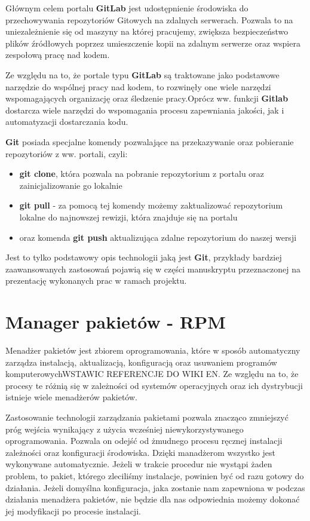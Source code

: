 Głównym celem portalu \textbf{GitLab} jest udostępnienie środowiska do przechowywania repozytoriów Gitowych na zdalnych serwerach. Pozwala to na uniezależnienie się od maszyny na której pracujemy, zwiększa bezpieczeństwo plików źródłowych poprzez umieszczenie kopii na zdalnym serwerze oraz wspiera zespołową pracę nad kodem.\par

Ze względu na to, że portale typu \textbf{GitLab} są traktowane jako podstawowe narzędzie do wspólnej pracy nad kodem, to rozwinęły one wiele narzędzi wspomagających organizację oraz śledzenie pracy.Oprócz ww. funkcji \textbf{Gitlab} dostarcza wiele narzędzi do wspomagania procesu zapewniania jakości, jak i automatyzacji dostarczania kodu.\par

\textbf{Git} posiada specjalne komendy pozwalające na przekazywanie oraz pobieranie repozytoriów z ww. portali, czyli:
\begin{itemize}
\item \textbf{git clone}, która pozwala na pobranie repozytorium z portalu oraz zainicjalizowanie go lokalnie
\item \textbf{git pull} - za pomocą tej komendy możemy zaktualizować repozytorium lokalne do najnowszej rewizji, która znajduje się na portalu
\item oraz komenda \textbf{git push} aktualizująca zdalne repozytorium do naszej wersji
\end{itemize}

Jest to tylko podstawowy opis technologii jaką jest \textbf{Git}, przykłady bardziej zaawansowanych zastosowań pojawią się w części manuskryptu przeznaczonej na prezentację wykonanych prac w ramach projektu.


\section{Manager pakietów - RPM}
Menadżer pakietów jest zbiorem oprogramowania, które w sposób automatyczny zarządza instalacją, aktualizacją, konfiguracją oraz usuwaniem programów komputerowychWSTAWIC REFERENCJE DO WIKI EN. Ze względu na to, że procesy te różnią się w zależności od systemów operacyjnych oraz ich dystrybucji istnieje wiele menadżerów pakietów.\par

Zastosowanie technologii zarządzania pakietami pozwala znacząco zmniejszyć próg wejścia wynikający z użycia wcześniej niewykorzystywanego oprogramowania. Pozwala on odejść od żmudnego procesu ręcznej instalacji zależności oraz konfiguracji środowiska. Dzięki manadżerom wszystko jest wykonywane automatycznie. Jeżeli w trakcie procedur nie wystąpi żaden problem, to pakiet, którego zleciliśmy instalacje, powinien być od razu gotowy do działania. Jeżeli domyślna konfiguracja, jaka zostanie nam zapewniona w podczas działania menadżera pakietów, nie będzie dla nas odpowiednia możemy dokonać jej modyfikacji po procesie instalacji.

